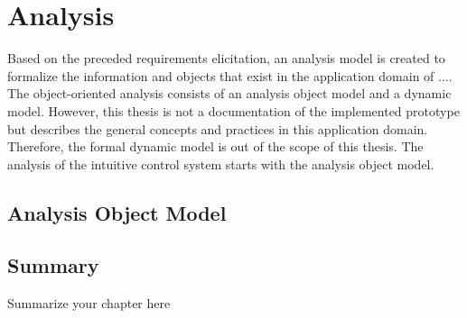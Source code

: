 \chapter{Analysis}

	Based on the preceded requirements elicitation, an analysis model is created to formalize the information and objects that exist in the application domain of .... The object-oriented analysis consists of an analysis object model and a dynamic model. \cite{Bruegge2004} However, this thesis is not a documentation of the implemented prototype but describes the general concepts and practices in this application domain. Therefore, the formal dynamic model is out of the scope of this thesis. The analysis of the intuitive control system starts with the analysis object model.
	
	\section{Analysis Object Model}
	


\section{Summary}

Summarize your chapter here
					
